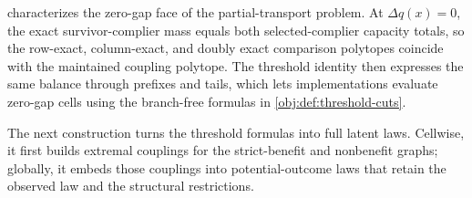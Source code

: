 \documentclass[11pt]{article}
\begin{document}
 characterizes the zero-gap face of the partial-transport problem. At \(\Delta q(x)=0\), the exact survivor-complier mass equals both selected-complier capacity totals, so the row-exact, column-exact, and doubly exact comparison polytopes coincide with the maintained coupling polytope. The threshold identity then expresses the same balance through prefixes and tails, which lets implementations evaluate zero-gap cells using the branch-free formulas in \cref{obj:def:threshold-cuts}.

The next construction turns the threshold formulas into full latent laws. Cellwise, it first builds extremal couplings for the strict-benefit and nonbenefit graphs; globally, it embeds those couplings into potential-outcome laws that retain the observed law and the structural restrictions.
\end{document}
